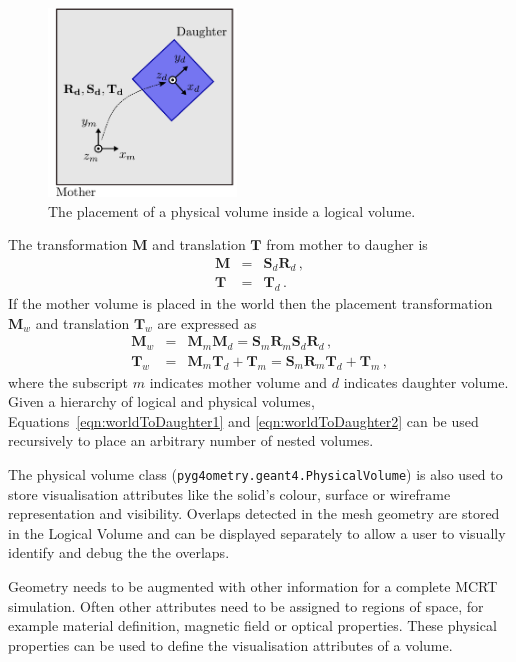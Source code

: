 \documentclass[final,5p,times,twocolumn]{elsarticle}
\newcommand{\pyinline}[1]{\lstinline[postbreak={}]{#1}}
\begin{document}
\begin{figure}[htb!]
\begin{center}
\includegraphics[width=5cm]{./diagrams/lvToPv.pdf}
\caption{The placement of a physical volume inside a logical volume.}
\label{fig:lvToPv}
\end{center}
\end{figure} 

The transformation  $\mathbf{M}$  and translation $\mathbf{T}$ from mother to daugher is 
\begin{eqnarray}
\mathbf{M} 	& = &  \mathbf{S}_d  \mathbf{R}_d\,, \\
\mathbf{T} 	& = &  \mathbf{T}_d\,.
\end{eqnarray}
%
If the mother volume is placed in the world then the placement transformation $\mathbf{M}_w$ and translation $\mathbf{T}_w$ are expressed as
\begin{eqnarray}
\mathbf{M}_w	  	& = & \mathbf{M}_m \mathbf{M}_d  = \mathbf{S}_m \mathbf{R}_m  \mathbf{S}_d \mathbf{R}_d\, ,				\label{eqn:worldToDaughter1}\\
\mathbf{T}	_w 		& = & \mathbf{M}_m \mathbf{T}_d + \mathbf{T}_m= \mathbf{S}_m \mathbf{R}_m \mathbf{T}_d + \mathbf{T}_m\,,  \label{eqn:worldToDaughter2}
\end{eqnarray}
where the subscript $m$ indicates mother volume and $d$ indicates daughter volume. Given a hierarchy of logical and physical volumes, 
Equations~\ref{eqn:worldToDaughter1} and \ref{eqn:worldToDaughter2} can be used recursively to place an arbitrary number of nested volumes.

The physical volume class (\pyinline{pyg4ometry.geant4.PhysicalVolume}) is also used to store visualisation attributes like the solid's 
colour, surface or wireframe representation and visibility. Overlaps detected in the mesh geometry are
stored in the Logical Volume and can be  displayed separately to allow a user to visually identify and debug the the overlaps.   

Geometry needs to be augmented with other information for a complete MCRT simulation. Often other attributes need to be 
assigned to regions of space, for example material definition, magnetic field or optical properties. These physical properties 
can be used to define the visualisation attributes of a volume. 
\end{document}
